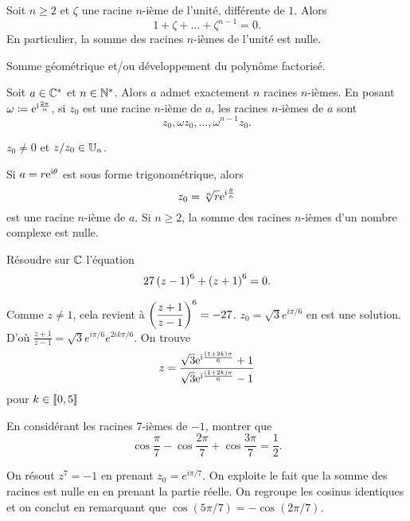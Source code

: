 \documentclass{magnoliaold}
\begin{document}
\begin{proposition}[utile=-3]
Soit $n\geq 2$ et $\zeta$ une racine $n$-ième de l'unité, différente de $1$.
Alors
\[1+\zeta+\dots+\zeta^{n-1}=0.\]
En particulier, la somme des racines $n$-ièmes de l'unité est nulle.
\end{proposition}

\begin{preuve}
Somme géométrique et/ou développement du polynôme factorisé.
\end{preuve}


\begin{proposition}[utile=-3]
Soit $a\in\mathbb{C}^*$ et $n\in{\mathbb{N}^*}$. Alors $a$ admet exactement $n$ racines $n$-ièmes. En posant $\omega\coloneqq{\rm e}^{{\rm i}\frac{2\pi}{n}}$, si $z_0$ est une racine $n$-ième de $a$, les racines $n$-ièmes de $a$ sont
\[z_0,\omega z_0,\ldots,\omega^{n-1}z_0.\]
\end{proposition}

\begin{preuve}
$z_0\neq 0$ et $z/z_0 \in \U[n]$.

\end{preuve}

\begin{remarques}
\remarque Si $a=r{\rm e}^{{\rm i}\theta}$ est sous forme trigonométrique, alors 
  \[z_0=\sqrt[n]{r}{\rm e}^{{\rm i}\frac{\theta}{n}}\]
  est une racine $n$-ième de $a$.
\remarque Si $n\geq 2$, la somme des racines $n$-ièmes d'un nombre complexe est
  nulle.
\end{remarques}

\begin{exos}
\exo Résoudre sur $\mathbb{C}$ l'équation
  \[27\left(z-1\right)^6+\left(z+1\right)^6=0.\]
  \begin{sol}
  Comme $z\neq 1$, cela revient à $\displaystyle \left(\frac{z+1}{z-1}\right)^6=-27$. $z_0=\sqrt{3}e^{i\pi/6}$ en est une solution. D'où $\frac{z+1}{z-1}=\sqrt{3}e^{i\pi/6}e^{2ik\pi/6}$.
  On trouve
  \[z=\frac{\sqrt{3}{\rm e}^{{\rm i}\frac{(1+2k)\pi}{6}}+1}{\sqrt{3}{\rm e}^{{\rm i}\frac{(1+2k)\pi}{6}}-1}\]
   pour $k\in\left\llbracket 0,5\right\rrbracket$
  \end{sol}
\exo En considérant les racines 7-ièmes de $-1$, montrer que
  \[\cos\frac{\pi}{7}-\cos\frac{2\pi}{7}+\cos\frac{3\pi}{7}=\frac{1}{2}.\]
  \begin{sol}
  On résout $z^7=-1$ en prenant $z_0=e^{i\pi/7}$. On exploite le fait que la somme des racines est nulle en en prenant la partie réelle. On regroupe les cosinus identiques et on conclut en remarquant que $\cos(5\pi/7)=-\cos(2\pi/7)$.
  \end{sol}
\end{exos}
\end{document}
